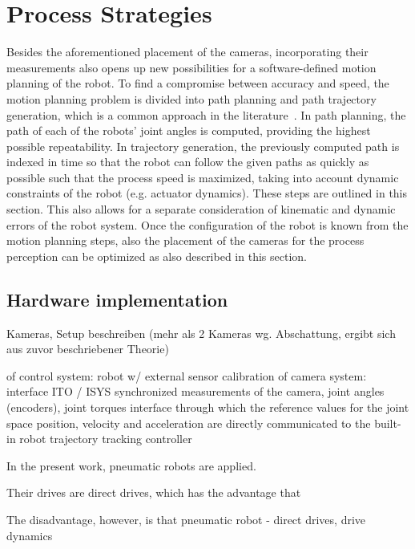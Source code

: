 \documentclass[5p,times,procedia]{elsarticle}
\begin{document}
\section{Process Strategies}
Besides the aforementioned placement of the cameras, incorporating their measurements also opens up new possibilities for a software-defined motion planning of the robot.
To find a compromise between accuracy and speed, the motion planning problem is divided into path planning and path trajectory generation, which is a common approach in the literature~\cite{Choset05}.
In path planning, the path of each of the robots' joint angles is computed, providing the highest possible repeatability.
In trajectory generation, the previously computed path is indexed in time so that the robot can follow the given paths as quickly as possible such that the process speed is maximized, taking into account dynamic constraints of the robot (e.g. actuator dynamics).
These steps are outlined in this section.
This also allows for a separate consideration of kinematic and dynamic errors of the robot system. 
Once the configuration of the robot is known from the motion planning steps, also the placement of the cameras for the process perception can be optimized as also described in this section. 

\subsection{Hardware implementation} 
Kameras, Setup beschreiben (mehr als 2 Kameras wg. Abschattung, ergibt sich aus zuvor beschriebener Theorie)


of control system: robot w/ external sensor
calibration of camera system: interface ITO / ISYS
synchronized measurements of the camera, joint angles (encoders), joint torques 
interface through which the reference values for the joint space position, velocity and acceleration are directly communicated to the built-in robot trajectory tracking controller

In the present work, pneumatic robots are applied. 

Their drives are direct drives, which has the advantage that


The disadvantage, however, is that 
pneumatic robot - direct drives, drive dynamics 
\end{document}
